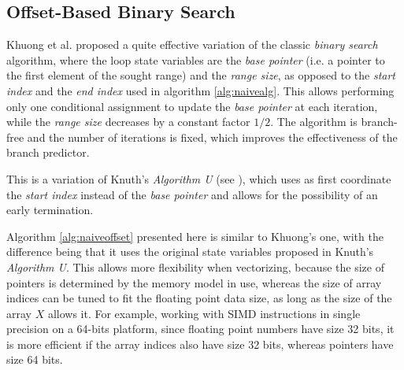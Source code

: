 \documentclass[preprint,1p,times]{elsarticle}
\begin{document}
\subsection{Offset-Based Binary Search}
\label{sec:offset}
Khuong et al. \cite{Morin2015} proposed a quite effective variation of the classic \textit{binary search} algorithm, where the loop state variables are the \textit{base pointer} (i.e. a pointer to the first element of the sought range) and the \textit{range size}, as opposed to the \textit{start index} and the \textit{end index} used in algorithm \ref{alg:naivealg}. This allows performing only one conditional assignment to update the \textit{base pointer} at each iteration, while the \textit{range size} decreases by a constant factor $1/2$. The algorithm is branch-free and the number of iterations is fixed, which improves the effectiveness of the branch predictor.

This is a variation of Knuth's \textit{Algorithm U} (see \cite{Knuth1997}), which uses as first coordinate the \textit{start index} instead of the \textit{base pointer} and allows for the possibility of an early termination.  


Algorithm \ref{alg:naiveoffset} presented here is similar to Khuong's one, with the difference being that it uses the original state variables proposed in Knuth's \textit{Algorithm U}. This allows more flexibility when vectorizing, because the size of pointers is determined by the memory model in use, whereas the size of array indices can be tuned to fit the floating point data size, as long as the size of the array $X$ allows it. For example, working with SIMD instructions in single precision on a 64-bits platform, since floating point numbers have size 32 bits, it is more efficient if the array indices also have size 32 bits, whereas pointers have size 64 bits.

\end{document}
